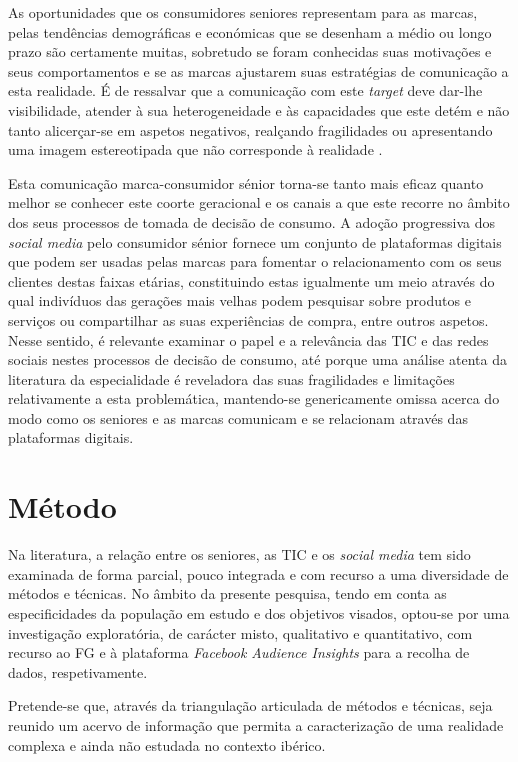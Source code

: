 \documentclass[portuguese]{textolivre}
\begin{document}
As oportunidades que os consumidores seniores representam para as marcas, pelas tendências demográficas e económicas que se desenham a médio ou longo prazo são certamente muitas, sobretudo se foram conhecidas suas motivações e seus comportamentos e se as marcas ajustarem suas estratégias de comunicação a esta realidade. É de ressalvar que a comunicação com este \emph{target} deve dar-lhe visibilidade, atender à sua heterogeneidade e às capacidades que este detém e não tanto alicerçar-se em aspetos negativos, realçando fragilidades ou apresentando uma imagem estereotipada que não corresponde à realidade \cite{niemelanyrhinen2007}.

Esta comunicação marca-consumidor sénior torna-se tanto mais eficaz quanto melhor se conhecer este coorte geracional e os canais a que este recorre no âmbito dos seus processos de tomada de decisão de consumo. A adoção progressiva dos \emph{social media} pelo consumidor sénior fornece um conjunto de plataformas digitais que podem ser usadas pelas marcas para fomentar o relacionamento com os seus clientes destas faixas etárias, constituindo estas igualmente um meio através do qual indivíduos das gerações mais velhas podem pesquisar sobre produtos e serviços ou compartilhar as suas experiências de compra, entre outros aspetos. Nesse sentido, é relevante examinar o papel e a relevância das TIC e das redes sociais nestes processos de decisão de consumo, até porque uma análise atenta da literatura da especialidade é reveladora das suas fragilidades e limitações relativamente a esta problemática, mantendo-se genericamente omissa acerca do modo como os seniores e as marcas comunicam e se relacionam através das plataformas digitais.

\section{Método}
Na literatura, a relação entre os seniores, as TIC e os \emph{social media} tem sido examinada de forma parcial, pouco integrada e com recurso a uma diversidade de métodos e técnicas. No âmbito da presente pesquisa, tendo em conta as especificidades da população em estudo e dos objetivos visados, optou-se por uma investigação exploratória, de carácter misto, qualitativo e quantitativo, com recurso ao FG e à plataforma \emph{Facebook Audience Insights} para a recolha de dados, respetivamente.

Pretende-se que, através da triangulação articulada de métodos e técnicas, seja reunido um acervo de informação que permita a caracterização de uma realidade complexa e ainda não estudada no contexto ibérico.
\end{document}
